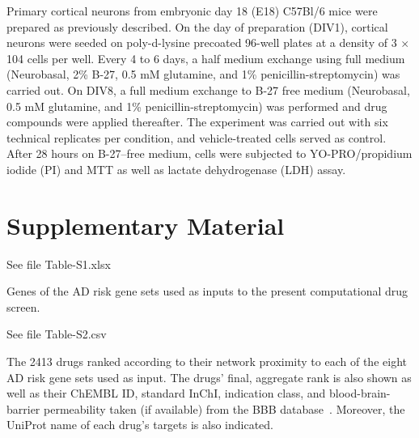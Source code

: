 \documentclass[letterpaper]{article}
\begin{document}
Primary cortical neurons from embryonic day 18 (E18) C57Bl/6 mice were
prepared as previously described. On the day of preparation (DIV1), cortical
neurons were seeded on poly-d-lysine precoated 96-well plates at a density of
3 $\times$ 104 cells per well. Every 4 to 6 days, a half medium exchange using full
medium (Neurobasal, 2\% B-27, 0.5 mM glutamine, and 1\% penicillin-streptomycin)
was carried out. On DIV8, a full medium exchange to B-27 free medium
(Neurobasal, 0.5 mM glutamine, and 1\% penicillin-streptomycin) was performed
and drug compounds were applied thereafter. The experiment was carried out
with six technical replicates per condition, and vehicle-treated cells
served as control. After 28 hours on B-27–free medium, cells were subjected to
YO-PRO/propidium iodide (PI) and MTT as well as lactate dehydrogenase (LDH)
assay.




\newpage

\section*{Supplementary Material}

\setcounter{table}{0}
\makeatletter 
\renewcommand{\tablename}{Table S} %
\makeatother

\setcounter{figure}{0}
\makeatletter 
\renewcommand{\figurename}{Figure S} %
\makeatother

\begin{table}[p]
  See file Table-S1.xlsx
\caption{
  Genes of the AD risk gene sets used as inputs to the present computational drug screen.
}
\label{tab:genes-in-genesets}
\end{table}

\begin{table}[p]
  See file Table-S2.csv
\caption{
  The 2413 drugs ranked according to their network proximity to each of the eight
  AD risk gene sets used as input.  The drugs' final, aggregate rank is also shown
  as well as their ChEMBL ID, standard InChI, indication class, and
  blood-brain-barrier permeability taken (if available) from the BBB
  database~\citep{Meng2021}.  Moreover, the UniProt name of each drug's
  targets is also indicated.
}
\label{tab:ranked-drugs}
\end{table}
\end{document}
